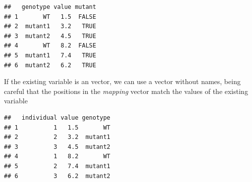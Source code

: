 \documentclass[krantz2]{krantz}\usepackage{knitr}
\begin{document}
\begin{knitrout}\footnotesize
{}\color{fgcolor}\begin{kframe}
\begin{alltt}
 \hlkwb{<-}
  \hlstd{(} \hlstd{=} \hlstd{(}\hlstd{(}\hlstd{,} \hlstd{,} \hlstd{),} \hlstd{),}
              \hlstd{=} \hlstd{(}\hlstd{,} \hlstd{,} \hlstd{,} \hlstd{,} \hlstd{,} \hlstd{))}
 \hlkwb{<-} \hlstd{(} \hlstd{=} \hlstd{,}  \hlstd{=} \hlstd{,}  \hlstd{=} \hlstd{)}
\hlopt{$} \hlkwb{<-} \hlstd{mutant[my.df}\hlopt{$}\hlstd{genotype]}
\end{alltt}
\begin{verbatim}
##   genotype value mutant
## 1       WT   1.5  FALSE
## 2  mutant1   3.2   TRUE
## 3  mutant2   4.5   TRUE
## 4       WT   8.2  FALSE
## 5  mutant1   7.4   TRUE
## 6  mutant2   6.2   TRUE
\end{verbatim}
\end{kframe}
\end{knitrout}

If the existing variable is an  vector, we can use a vector without names, being careful that the positions in the \emph{mapping} vector match the values of the existing variable

\begin{knitrout}\footnotesize
{}\color{fgcolor}\begin{kframe}
\begin{alltt}
 \hlkwb{<-} \hlstd{(} \hlstd{=} \hlstd{(}\hlopt{:}\hlstd{,} \hlstd{),}
                     \hlstd{=} \hlstd{(}\hlstd{,} \hlstd{,} \hlstd{,} \hlstd{,} \hlstd{,} \hlstd{))}
 \hlkwb{<-} \hlstd{(}\hlstd{,} \hlstd{,} \hlstd{)}
\hlopt{$} \hlkwb{<-} \hlstd{genotype[my.df}\hlopt{$}\hlstd{individual]}
\end{alltt}
\begin{verbatim}
##   individual value genotype
## 1          1   1.5       WT
## 2          2   3.2  mutant1
## 3          3   4.5  mutant2
## 4          1   8.2       WT
## 5          2   7.4  mutant1
## 6          3   6.2  mutant2
\end{verbatim}
\end{kframe}
\end{knitrout}
\end{document}
